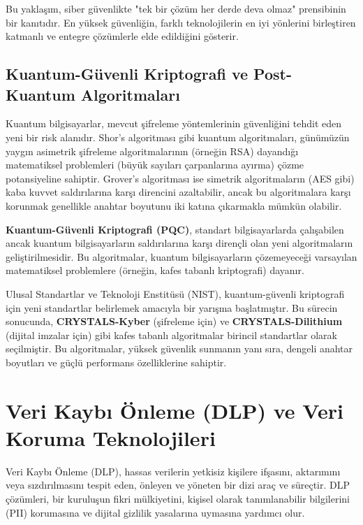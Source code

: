 Bu yaklaşım, siber güvenlikte "tek bir çözüm her derde deva olmaz" prensibinin bir kanıtıdır. En yüksek güvenliğin, farklı teknolojilerin en iyi yönlerini birleştiren katmanlı ve entegre çözümlerle elde edildiğini gösterir.

\subsection{Kuantum-Güvenli Kriptografi ve Post-Kuantum Algoritmaları}

Kuantum bilgisayarlar, mevcut şifreleme yöntemlerinin güvenliğini tehdit eden yeni bir risk alanıdır. Shor's algoritması gibi kuantum algoritmaları, günümüzün yaygın asimetrik şifreleme algoritmalarının (örneğin RSA) dayandığı matematiksel problemleri (büyük sayıları çarpanlarına ayırma) çözme potansiyeline sahiptir. Grover's algoritması ise simetrik algoritmaların (AES gibi) kaba kuvvet saldırılarına karşı direncini azaltabilir, ancak bu algoritmalara karşı korunmak genellikle anahtar boyutunu iki katına çıkarmakla mümkün olabilir.

\textbf{Kuantum-Güvenli Kriptografi (PQC)}, standart bilgisayarlarda çalışabilen ancak kuantum bilgisayarların saldırılarına karşı dirençli olan yeni algoritmaların geliştirilmesidir. Bu algoritmalar, kuantum bilgisayarların çözemeyeceği varsayılan matematiksel problemlere (örneğin, kafes tabanlı kriptografi) dayanır.

Ulusal Standartlar ve Teknoloji Enstitüsü (NIST), kuantum-güvenli kriptografi için yeni standartlar belirlemek amacıyla bir yarışma başlatmıştır. Bu sürecin sonucunda, \textbf{CRYSTALS-Kyber} (şifreleme için) ve \textbf{CRYSTALS-Dilithium} (dijital imzalar için) gibi kafes tabanlı algoritmalar birincil standartlar olarak seçilmiştir. Bu algoritmalar, yüksek güvenlik sunmanın yanı sıra, dengeli anahtar boyutları ve güçlü performans özelliklerine sahiptir.

\section{Veri Kaybı Önleme (DLP) ve Veri Koruma Teknolojileri}

Veri Kaybı Önleme (DLP), hassas verilerin yetkisiz kişilere ifşasını, aktarımını veya sızdırılmasını tespit eden, önleyen ve yöneten bir dizi araç ve süreçtir. DLP çözümleri, bir kuruluşun fikri mülkiyetini, kişisel olarak tanımlanabilir bilgilerini (PII) korumasına ve dijital gizlilik yasalarına uymasına yardımcı olur.

